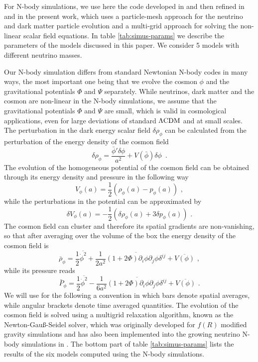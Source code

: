 For N-body simulations, we use here the code developed in \cite{ayaita_neutrino_2013,ayaita_nonlinear_2016,ayaita_structure_2012}
and then refined in \cite{fuhrer_backreaction_2015} and in the present
work, which uses a particle-mesh approach for the neutrino and dark
matter particle evolution and a multi-grid approach for solving the
non-linear scalar field equations. In table \ref{tab:simus-params}
we describe the parameters of the models discussed in this paper.
We consider 5 models with different neutrino masses.

Our N-body simulation differs from standard Newtonian N-body codes
in many ways, the most important one being that we evolve the cosmon
$\phi$ and the gravitational potentials $\Phi$ and $\Psi$ separately.
While neutrinos, dark matter and the cosmon are non-linear in the
N-body simulations, we assume that the gravitational potentials $\Phi$
and $\Psi$ are small, which is valid in cosmological applications,
even for large deviations of standard $\Lambda\mathrm{CDM}$ and at small scales.
The perturbation in the dark energy scalar field $\delta\rho_{\phi}$
can be calculated from the perturbation of the energy density of the
cosmon field 
\begin{equation}
\delta\rho_{\phi}=\frac{\bar{\phi}'\delta\phi}{a^{2}}+V(\bar{\phi})\delta\phi\,\,\,.\label{eq:perturbed-cosmon}
\end{equation}
The evolution of the homogeneous potential of the cosmon field can
be obtained through its energy density and pressure in the following
way 
\begin{equation}
V_{\phi}(a)=\frac{1}{2}(\rho_{\phi}(a)-p_{\phi}(a))\,\,,
\end{equation}
while the perturbations in the potential can be approximated by 
\begin{equation}
\delta V_{\phi}(a)=-\frac{1}{2}(\delta\rho_{\phi}(a)+3\delta p_{\phi}(a))\,\,.
\end{equation}
The cosmon field can cluster and therefore its spatial gradients are
non-vanishing, so that after averaging over the volume of the box
the energy density of the cosmon field is 
\begin{equation}
\bar{\rho}_{\phi}=\frac{1}{2}\overline{\dot{\phi}^{2}}+\frac{1}{2a^{2}}\overline{(1+2\Phi)\partial_{i}\phi\partial_{j}\phi\delta^{ij}}+\overline{V(\phi)}\,\,,
\end{equation}
while its pressure reads 
\begin{equation}
\bar{P}_{\phi}=\frac{1}{2}\overline{\dot{\phi}^{2}}-\frac{1}{6a^{2}}\overline{(1+2\Phi)\partial_{i}\phi\partial_{j}\phi\delta^{ij}}+\overline{V(\phi)}\,\,.
\end{equation}
We will use for the following a convention in which bars denote spatial
averages, while angular brackets denote time averaged quantities.
The evolution of the cosmon field is solved using a multigrid relaxation
algorithm, known as the Newton-Gauß-Seidel solver, which was originally
developed for $f(R)$ modified gravity simulations \cite{puchwein_modified-gravity-gadget:_2013}
and has also been implemented into the growing neutrino N-body simulations
in \cite{ayaita_nonlinear_2016}. The bottom part of table \ref{tab:simus-params}
lists the results of the six models computed using the N-body simulations.

